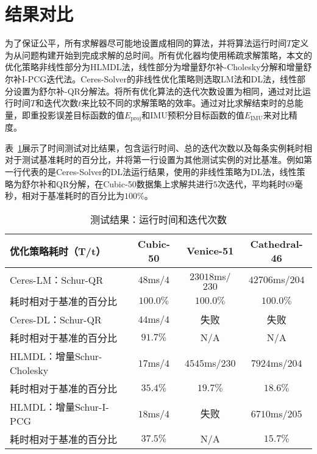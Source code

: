 \section{结果对比}

为了保证公平，所有求解器尽可能地设置成相同的算法，并将算法运行时间$T$定义为从问题构建开始到完成求解的总时间。所有优化器均使用稀疏求解策略，本文的优化策略非线性部分为HLMDL法，线性部分为增量舒尔补-Cholesky分解和增量舒尔补I-PCG迭代法。Ceres-Solver的非线性优化策略则选取LM法和DL法，线性部分设置为舒尔补-QR分解法。将所有优化算法的迭代次数设置为相同，通过对比运行时间$T$和迭代次数$t$来比较不同的求解策略的效率。通过对比求解结束时的总能量，即重投影误差目标函数的值$E_{\text{proj}}$和IMU预积分目标函数的值$E_{\text{IMU}}$来对比精度。

表~\ref{tab:time}展示了时间测试对比结果，包含运行时间、总的迭代次数以及每条实例耗时相对于测试基准耗时的百分比，并将第一行设置为其他测试实例的对比基准。例如第一行代表的是Ceres-Solver的DL法运行结果，使用的非线性策略为DL法，线性策略为舒尔补和QR分解，在Cubic-50数据集上求解共进行$5$次迭代，平均耗时$69$毫秒，相对于基准耗时的百分比为$100\%$。

{
\linespread{1}
\begin{table}[htb!]
\caption{测试结果：运行时间和迭代次数}
\label{tab:time}
\centering
\begin{tabular}[b]{l|ccc}
    \toprule
    优化策略耗时（T/t）       &   Cubic-50 &       Venice-51 &    Cathedral-46 \\ \midrule
    Ceres-LM：Schur-QR        & $48$ms/$4$ & $23018$ms/$230$ & $42706$ms/$204$ \\
    耗时相对于基准的百分比    &  $100.0\%$ &       $100.0\%$ &       $100.0\%$ \\ \midrule
    Ceres-DL：Schur-QR        & $44$ms/$4$ &            失败 &            失败 \\
    耗时相对于基准的百分比    &   $91.7\%$ &             N/A &             N/A \\ \midrule
    HLMDL：增量Schur-Cholesky & $17$ms/$4$ &  $4545$ms/$230$ &  $7924$ms/$204$ \\
    耗时相对于基准的百分比    &   $35.4\%$ &        $19.7\%$ &        $18.6\%$ \\ \midrule
    HLMDL：增量Schur-I-PCG    & $18$ms/$4$ &            失败 &  $6710$ms/$205$ \\
    耗时相对于基准的百分比    &   $37.5\%$ &             N/A &        $15.7\%$ \\
    \bottomrule
\end{tabular}
\end{table}
}

